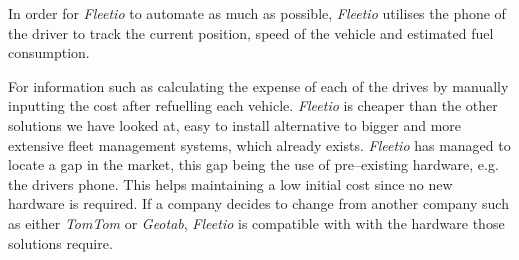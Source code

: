 In order for \textit{Fleetio} to automate as much as possible, \textit{Fleetio} utilises the phone of the driver to track the current position, speed of the vehicle and estimated fuel consumption.

For information such as calculating the expense of each of the drives by manually inputting the cost after refuelling each vehicle.
\textit{Fleetio} is cheaper than the other solutions we have looked at, easy to install alternative to bigger and more extensive fleet management systems, which already exists.
\textit{Fleetio} has managed to locate a gap in the market, this gap being the use of pre--existing hardware, e.g. the drivers phone.
This helps maintaining a low initial cost since no new hardware is required.
If a company decides to change from another company such as either \textit{TomTom} or \textit{Geotab}, \textit{Fleetio} is compatible with with the hardware those solutions require.
